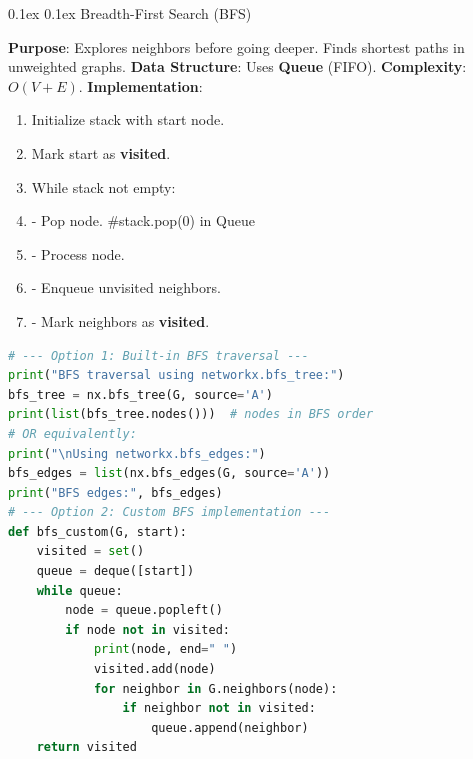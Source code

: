 \documentclass[8pt,landscape]{article}
\makeatletter
\renewcommand{\subsection}{\@startsection{subsection}{2}{0pt}%
    {0.1ex}%
    {0.1ex}%
    {\fontsize{8}{9}\bfseries\color{blue}}} %
\newcommand{\smalltext}[1]{%
  {\fontsize{8}{9}\selectfont\sloppy #1\par}%
}
\makeatother
\begin{document}
\begin{multicols}{3}
\subsection{Breadth-First Search (BFS)}
\smalltext{
\textbf{Purpose}: Explores neighbors before going deeper. Finds shortest paths in unweighted graphs.
\textbf{Data Structure}: Uses \textbf{Queue} (FIFO).
\textbf{Complexity}: $O(V+E)$.
\textbf{Implementation}:
\begin{enumerate}[noitemsep, nolistsep, leftmargin=1em]
    \item Initialize stack with start node.
    \item Mark start as \textbf{visited}.
    \item While stack not empty:
    \item \hspace{0.5em}- Pop node. \#stack.pop(0) in Queue
    \item \hspace{0.5em}- Process node.
    \item \hspace{0.5em}- Enqueue unvisited neighbors.
    \item \hspace{0.5em}- Mark neighbors as \textbf{visited}.
\end{enumerate}
}
\begin{lstlisting}[language=Python]
# --- Option 1: Built-in BFS traversal ---
print("BFS traversal using networkx.bfs_tree:")
bfs_tree = nx.bfs_tree(G, source='A')
print(list(bfs_tree.nodes()))  # nodes in BFS order
# OR equivalently:
print("\nUsing networkx.bfs_edges:")
bfs_edges = list(nx.bfs_edges(G, source='A'))
print("BFS edges:", bfs_edges)
# --- Option 2: Custom BFS implementation ---
def bfs_custom(G, start):
    visited = set()
    queue = deque([start])
    while queue:
        node = queue.popleft()
        if node not in visited:
            print(node, end=" ")
            visited.add(node)
            for neighbor in G.neighbors(node):
                if neighbor not in visited:
                    queue.append(neighbor)
    return visited
\end{lstlisting}


\end{multicols}
\end{document}

